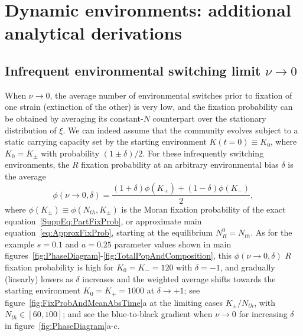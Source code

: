 \documentclass{article}
\begin{document}
\section{Dynamic environments: additional analytical derivations}\label{SuppSec:DynEnv}

\subsection{Infrequent environmental switching limit \(\nu\rightarrow0\)}\label{SuppSec:SlowEnv}

When \(\nu\to0\), the average number of environmental switches prior to fixation of one strain (extinction of the other) is very low, and the fixation probability can be obtained by averaging its constant-$N$ counterpart over the stationary distribution of $\xi$. We can indeed  assume that the community evolves subject to a static carrying capacity set by the starting environment \(K(t=0)\equiv K_0\), where \(K_0=K_{\pm}\) with probability \((1\pm\delta)/2\). For these infrequently switching environments, the $R$ fixation probability at an arbitrary environmental bias \(\delta\) is the average
\begin{equation}
\phi\left(\nu\rightarrow0,\delta\right)=\frac{(1+\delta)\phi\left(K_+\right)+(1-\delta)\phi\left(K_-\right)}{2},
\label{SuppEq:SlowFixProb}
\end{equation}
where \(\phi\left(K_{\pm}\right)\equiv\phi\left(N_{th},K_{\pm}\right)\) is the Moran fixation probability of the exact equation~\eqref{SuppEq:PartFixProb}, or approximate main equation~\eqref{eq:ApproxFixProb}, starting at the equilibrium \(N_R^0=N_{th}\). As for the example \(s=0.1\) and \(a=0.25\) parameter values shown in main figures~\ref{fig:PhaseDiagram}-\ref{fig:TotalPopAndComposition}, this \(\phi\left(\nu\rightarrow0,\delta\right)\) $R$ fixation probability is high for \(K_0=K_{-}=120\) with \(\delta=-1\), and gradually (linearly) lowers as \(\delta\) increases and the weighted average shifts towards the starting environment \(K_0=K_{+}=1000\) at \(\delta\to+1\); see figure~\ref{fig:FixProbAndMeanAbsTime}a at the limiting cases \(K_{\pm}/N_{th}\), with \(N_{th}\in[60,100]\); and see the blue-to-black gradient when \(\nu\to0\) for increasing \(\delta\) in figure~\ref{fig:PhaseDiagram}a-c.
\end{document}
